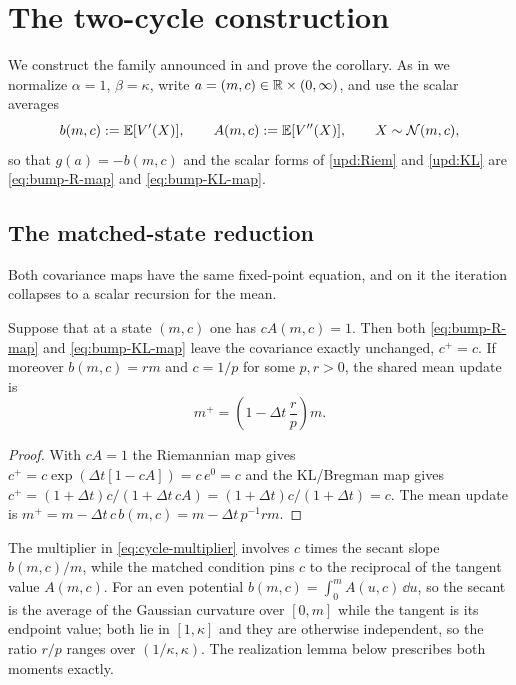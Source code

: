 \section{The two-cycle construction}
\label{app:cycle}

We construct the family announced in  and prove the corollary. As in
 we normalize $\alpha=1$, $\beta=\kappa$, write $a=(m,c)\in\mathbb{R}\times(0,\infty)$,
and use the scalar averages
\begin{equation}\label{eq:cycle-bA}
    b(m,c):=\mathbb{E}[V'(X)],
    \qquad
    A(m,c):=\mathbb{E}[V''(X)],
    \qquad
    X\sim\mathcal{N}(m,c),
\end{equation}
so that $g(a)=-b(m,c)$ and the scalar forms of \eqref{upd:Riem} and \eqref{upd:KL} are
\eqref{eq:bump-R-map} and \eqref{eq:bump-KL-map}.

\subsection{The matched-state reduction}

Both covariance maps have the same fixed-point equation, and on it the iteration collapses
to a scalar recursion for the mean.

\begin{proposition}\label{prop:cycle-frozen}
    Suppose that at a state $(m,c)$ one has $cA(m,c)=1$. Then both
    \eqref{eq:bump-R-map} and \eqref{eq:bump-KL-map} leave the covariance exactly unchanged,
    $c^+=c$. If moreover $b(m,c)=rm$ and $c=1/p$ for some $p,r>0$, the shared mean update is
    \begin{equation}\label{eq:cycle-multiplier}
        m^+=\left(1-\Delta t\,\frac rp\right)m .
    \end{equation}
\end{proposition}

\begin{proof}
    With $cA=1$ the Riemannian map gives $c^+=c\exp(\Delta t[1-cA])=c\,e^0=c$ and the
    KL/Bregman map gives $c^+=(1+\Delta t)c/(1+\Delta t\,cA)=(1+\Delta t)c/(1+\Delta t)=c$.
    The mean update is $m^+=m-\Delta t\,c\,b(m,c)=m-\Delta t\,p^{-1}rm$.
\end{proof}

The multiplier in \eqref{eq:cycle-multiplier} involves $c$ times the secant slope
$b(m,c)/m$, while the matched condition pins $c$ to the reciprocal of the tangent value
$A(m,c)$. For an even potential $b(m,c)=\int_0^mA(u,c)\,\dd u$, so the secant is the average
of the Gaussian curvature over $[0,m]$ while the tangent is its endpoint value; both lie in
$[1,\kappa]$ and they are otherwise independent, so the ratio $r/p$ ranges over
$(1/\kappa,\kappa)$. The realization lemma below prescribes both moments exactly.

